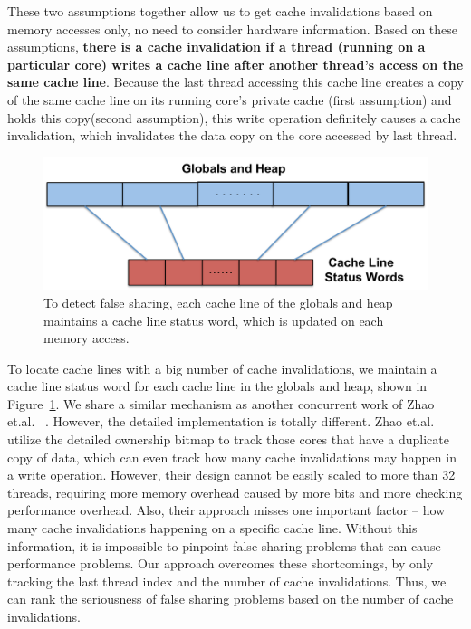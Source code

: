 These two assumptions together allow us to get cache invalidations based on memory accesses only, no need to consider hardware information. Based on these assumptions, \textbf{there is a cache invalidation if a thread (running on a particular core) writes a cache line after another thread's access on the same cache line}. Because the last thread accessing this cache line creates a copy of the same cache line on its running core's private cache (first assumption) and holds this copy(second assumption), this write operation definitely causes a cache invalidation, which invalidates the data copy on the core accessed by last thread. 


\begin{figure}[!t]
\centering
\includegraphics[width=6in]{fig/cachelinestatuswords}
\caption{
To detect false sharing, each cache line of the globals and heap maintains a cache line status word, which is updated on each memory access. \label{fig:cachelinestatusword}}
\end{figure}


To locate cache lines with a big number of cache invalidations, we maintain a cache line status word for each cache line in the globals and heap, shown in Figure~\ref{fig:cachelinestatusword}. We share a similar mechanism as another concurrent work of Zhao et.al. ~\cite{qinzhao}. 
However, the detailed implementation is totally different. Zhao et.al. utilize the detailed ownership bitmap to track those cores that have a duplicate copy of data, which can even track how many cache invalidations may happen in a write operation. However, their design cannot be easily scaled to more than 32 threads, requiring more memory overhead caused by more bits and more checking performance overhead. Also, their approach misses one important factor -- how many cache invalidations happening on a specific cache line. Without this information, it is impossible to pinpoint false sharing problems that can cause performance problems.
Our approach overcomes these shortcomings, by only tracking the last thread index and the number of cache invalidations.  Thus, we can rank the seriousness of false sharing problems based on the number of cache invalidations.
 

